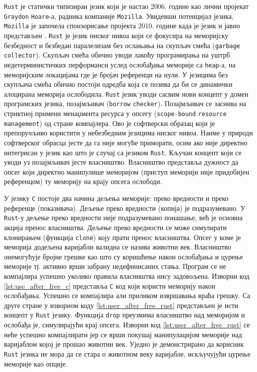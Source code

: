\verb|Rust| је статички типизиран језик који је настао 2006. године као лични пројекат \verb|Graydon| \verb|Hoare|-а, радника компаније 
\verb|Mozilla|. Увидевши потенцијал језика, \verb|Mozilla| је започела спонзорисање пројекта 2010. године када је језик и јавно 
представљен \cite{rust-language}. \verb|Rust| је језик ниског нивоа који се фокусира на меморијску безбедност
и безбедан паралелизам без ослањања на скупљач смећа (\verb|garbage| \verb|collector|). Скупљач смећа 
обично уводи лакоћу програмирања на уштрб недетерминистичких перформанси услед ослобађања меморије 
са \verb|heap|-а, на меморијским локацијама где је бројач референци на нули. У језицима без скупљача 
смећа обично постоји одредба која се позива да би се динамички алоцирана меморија ослободила. \verb|Rust|
језик уводи сасвим нови концепт у домен програмских језика, позајмљивач (\verb|borrow| \verb|checker|).
Позајмљивач се заснива на стриктној примени менаџмента ресурса у опсегу (\verb|scope-bound| \verb|resource| \verb|management|) 
од стране компајлера. Ово је софтверски образац који је препоручљиво користити у небезбедним језицима 
ниског нивоа. Наиме у природи софтверског обрасца јесте да га није могуће приморати, осим ако није директно
интегрисан у језик као што је случај са језиком \verb|Rust|. Кључан концепт који се уводи уз позајмљивач 
јесте власништво. Власништво представља дужност да опсег који директно манипулише меморијом (приступ меморији није 
придобијен референцом) ту меморију на крају опсега ослободи. 

У језику \verb|C| постоје два начина дељења 
меморије: преко вредности и преко референце (показивача). Дељење преко вредности (копија) је
подразумевано. У \verb|Rust|-у дељење преко вредности није подразумевано понашање, већ је основна акција пренос власништва.
Дељење преко вредности се може симулирати клонирањем (функција \verb|clone|) коју прати пренос власништва.
Опсег у коме је меморија додељена варијабли валидна 
се назива животни век. Власништво онемогућује бројне грешке као што су коришћење након ослобађања и цурење 
меморије тј. активно врши забрану недефинисаних стања. Програм се не компајлира успешно уколико правила 
власништва нису задовољена. Изворни код \ref{lst:use_after_free_c} представља \verb|C| код који користи меморију 
након ослобађања. Успешно се компајлира али приликом извршавања враћа грешку. Са друге стране у изворном 
коду \ref{lst:user_after_free_rust} представљен је исти концепт у \verb|Rust| језику. Функција 
\verb|drop| преузмима власништво над меморијом 
и ослобађа је, симулирајући крај опсега. Изворни код \ref{lst:user_after_free_rust} се неће 
успешно компајлирати јер се врши покушај манипулацијом меморије над варијаблом којој је прошао животни век.
Уједно је демонстрирано да корисник \verb|Rust| језика не мора да се стара о животном веку варијабле, искључујући
цурење меморије као опције.

